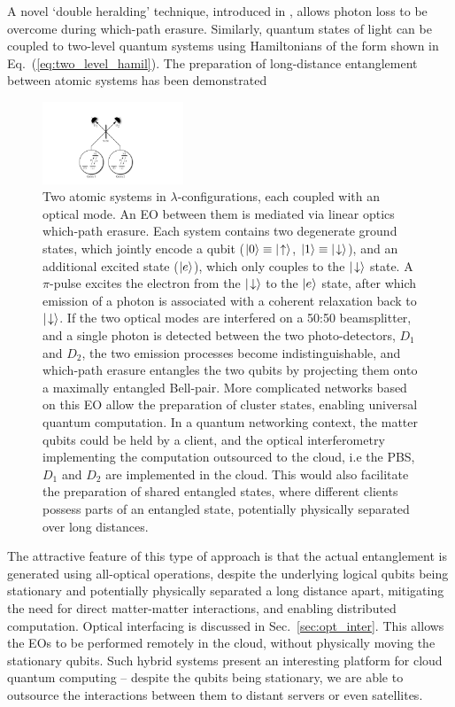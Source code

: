 A novel `double heralding' technique, introduced in \cite{bib:BarrettKok05}, allows photon loss to be overcome during which-path erasure. Similarly, quantum states of light can be coupled to two-level quantum systems using Hamiltonians of the form shown in Eq.~(\ref{eq:two_level_hamil}). The preparation of long-distance entanglement between atomic systems has been demonstrated \cite{bib:Matsukevich05, bib:Matsukevich05b}

\begin{figure}[!htb]
\includegraphics[width=0.375\textwidth]{barrett_kok}
\caption{Two atomic systems in $\lambda$-configurations, each coupled with an optical mode. An EO between them is mediated via linear optics which-path erasure. Each system contains two degenerate ground states, which jointly encode a qubit (\mbox{$|0\rangle\equiv|\!\uparrow\rangle$}, \mbox{$|1\rangle\equiv|\!\downarrow\rangle$}), and an additional excited state ($|e\rangle$), which only couples to the $|\!\downarrow\rangle$ state. A $\pi$-pulse excites the electron from the $|\!\downarrow\rangle$ to the $|e\rangle$ state, after which emission of a photon is associated with a coherent relaxation back to $|\!\downarrow\rangle$. If the two optical modes are interfered on a 50:50 beamsplitter, and a single photon is detected between the two photo-detectors, $D_1$ and $D_2$, the two emission processes become indistinguishable, and which-path erasure entangles the two qubits by projecting them onto a maximally entangled Bell-pair. More complicated networks based on this EO allow the preparation of cluster states, enabling universal quantum computation. In a quantum networking context, the matter qubits could be held by a client, and the optical interferometry implementing the computation outsourced to the cloud, i.e the PBS, $D_1$ and $D_2$ are implemented in the cloud. This would also facilitate the preparation of shared entangled states, where different clients possess parts of an entangled state, potentially physically separated over long distances.} \label{fig:barrett_kok}
\end{figure}

The attractive feature of this type of approach is that the actual entanglement is generated using all-optical operations, despite the underlying logical qubits being stationary and potentially physically separated a long distance apart, mitigating the need for direct matter-matter interactions, and enabling distributed computation. Optical interfacing is discussed in Sec.~\ref{sec:opt_inter}. This allows the EOs to be performed remotely in the cloud, without physically moving the stationary qubits. Such hybrid systems present an interesting platform for cloud quantum computing -- despite the qubits being stationary, we are able to outsource the interactions between them to distant servers or even satellites.

